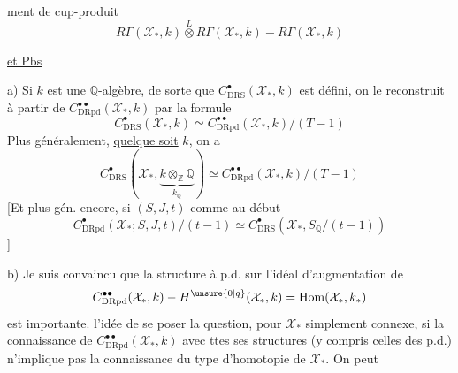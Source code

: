 ment de cup-produit
\[
R\Gamma(\mathcal X_*,k)\overset{L}{\otimes}R\Gamma(\mathcal X_*,k)\mathbin{-}R\Gamma(\mathcal X_*,k)
\]

\uline{ et Pbs}

a) Si $k$ est une $\mathbb Q$-algèbre, de sorte que $C^\bullet_{\mathrm{DRS}}(\mathcal X_*,k)$ est défini, on le reconstruit à partir de $C^{\bullet\bullet}_{\mathrm{DRpd}}(\mathcal X_*,k)$  par la formule
\[
C^\bullet_{\mathrm{DRS}}(\mathcal X_*,k)\simeq C^{\bullet\bullet}_{\mathrm{DRpd}}(\mathcal X_*,k)/(T-1)
\]
Plus généralement, \uline{quelque soit} $k$, on a
\[
C^\bullet_{\mathrm{DRS}}(\mathcal X_*,\underbrace{k\otimes_{\mathbb Z}\mathbb Q}_{k_{\mathbb Q}})\simeq C^{\bullet\bullet}_{\mathrm{DRpd}}(\mathcal X_*,k)/(T-1)
\]
[Et plus gén. encore, si $(S,J,t)$ comme au début
\[
C^\bullet_{\mathrm{DRpd}}(\mathcal X_*;S,J,t)/(t-1)\simeq C^\bullet_{\mathrm{DRS}}(\mathcal X_*,S_{\mathbb Q}/(t-1))
\]
]

b) Je suis convaincu que la structure à p.d. sur l'idéal d'augmentation de
\[
C^{\bullet\bullet}_{\mathrm{DRpd}}(\mathcal X_*,k)\mathbin{-}H^{\unsure{0|q}}(\mathcal X_*,k)=\operatorname{Hom}(\mathcal X_*,k_*)
\]
est importante.  l'idée de se poser la question, pour $\mathcal X_*$ simplement connexe,  si la connaissance de $C^{\bullet\bullet}_{\mathrm{DRpd}}(\mathcal X_*,k)$ \uline{avec ttes ses structures} (y compris celles des p.d.) n'implique pas la connaissance du type d'homotopie de $\mathcal X_*$. On peut
